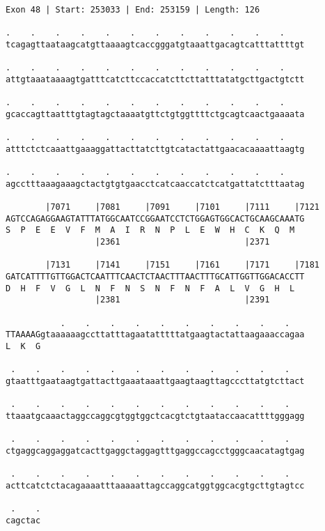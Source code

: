 \documentclass{article}
\begin{document}
\begin{Verbatim}[fontfamily=courier]
Exon 48 | Start: 253033 | End: 253159 | Length: 126

.    .    .    .    .    .    .    .    .    .    .    .    
tcagagttaataagcatgttaaaagtcaccgggatgtaaattgacagtcatttattttgt

.    .    .    .    .    .    .    .    .    .    .    .    
attgtaaataaaagtgatttcatcttccaccatcttcttatttatatgcttgactgtctt

.    .    .    .    .    .    .    .    .    .    .    .    
gcaccagttaatttgtagtagctaaaatgttctgtggttttctgcagtcaactgaaaata

.    .    .    .    .    .    .    .    .    .    .    .    
atttctctcaaattgaaaggattacttatcttgtcatactattgaacacaaaattaagtg

.    .    .    .    .    .    .    .    .    .    .    .    
agcctttaaagaaagctactgtgtgaacctcatcaaccatctcatgattatctttaatag

        |7071     |7081     |7091     |7101     |7111     |7121
AGTCCAGAGGAAGTATTTATGGCAATCCGGAATCCTCTGGAGTGGCACTGCAAGCAAATG
S  P  E  E  V  F  M  A  I  R  N  P  L  E  W  H  C  K  Q  M  
                  |2361                         |2371       

        |7131     |7141     |7151     |7161     |7171     |7181
GATCATTTTGTTGGACTCAATTTCAACTCTAACTTTAACTTTGCATTGGTTGGACACCTT
D  H  F  V  G  L  N  F  N  S  N  F  N  F  A  L  V  G  H  L  
                  |2381                         |2391       

           .    .    .    .    .    .    .    .    .    .   
TTAAAAGgtaaaaaagccttatttagaatatttttatgaagtactattaagaaaccagaa
L  K  G                                                     

 .    .    .    .    .    .    .    .    .    .    .    .   
gtaatttgaataagtgattacttgaaataaattgaagtaagttagcccttatgtcttact

 .    .    .    .    .    .    .    .    .    .    .    .   
ttaaatgcaaactaggccaggcgtggtggctcacgtctgtaataccaacattttgggagg

 .    .    .    .    .    .    .    .    .    .    .    .   
ctgaggcaggaggatcacttgaggctaggagtttgaggccagcctgggcaacatagtgag

 .    .    .    .    .    .    .    .    .    .    .    .   
acttcatctctacagaaaatttaaaaattagccaggcatggtggcacgtgcttgtagtcc

 .    .
cagctac
\end{Verbatim}
\newpage
\end{document}
